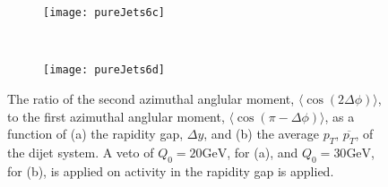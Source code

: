 	\begin{figure}[bth]
		\begin{subfigure}[b]{0.48\textwidth}
			\texttt{[image: pureJets6c]}
			\caption{}
			\label{fig:}
		\end{subfigure}
		~
		\begin{subfigure}[b]{0.48\textwidth}
			\texttt{[image: pureJets6d]}
			\caption{}
			\label{fig:}
		\end{subfigure}
		\caption{The ratio of the second azimuthal anglular moment, $\langle \cos(2\Delta\phi)\rangle$, to the first azimuthal
		         anglular moment, $\langle \cos(\pi-\Delta\phi)\rangle$, as a function of (a) the rapidity gap, $\Delta y$, and (b) the
		         average $p_T$, $\overline{p_T}$, of the dijet system.  A veto of $Q_0=20\text{GeV}$, for (a), and $Q_0=30\text{GeV}$,
		         for (b), is applied on activity in the rapidity gap is applied.}
		\label{fig:atlasPJ6}
	\end{figure}




